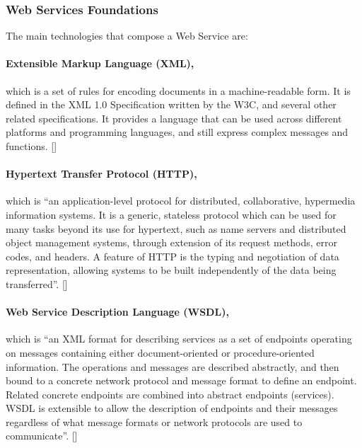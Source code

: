 \subsubsection{Web Services Foundations}
The main technologies that compose a Web Service are:

\paragraph{Extensible Markup Language (XML),}
which is a set of rules for encoding documents in a machine-readable form. It is defined in the XML 1.0 Specification written by the W3C, and several other related specifications. It provides a language that can be used across different platforms and programming languages, and still express complex messages and functions. [\citet{XML}]

\paragraph{Hypertext Transfer Protocol (HTTP),} 
which is ``an application-level protocol for distributed, collaborative, hypermedia information systems. It is a generic, stateless protocol which can be used for many tasks beyond its use for hypertext, such as name servers and distributed object management systems, through extension of its request methods, error codes, and headers. A feature of HTTP is the typing and negotiation of data representation, allowing systems to be built independently of the data being transferred''. [\citet{HTTP}]

\paragraph{Web Service Description Language (WSDL),}
which is ``an XML format for describing services as a set of endpoints operating on messages containing either document-oriented or procedure-oriented information. The operations and messages are described abstractly, and then bound to a concrete network protocol and message format to define an endpoint. Related concrete endpoints are combined into abstract endpoints (services). WSDL is extensible to allow the description of endpoints and their messages regardless of what message formats or network protocols are used to communicate''. [\citet{WSDL}]

